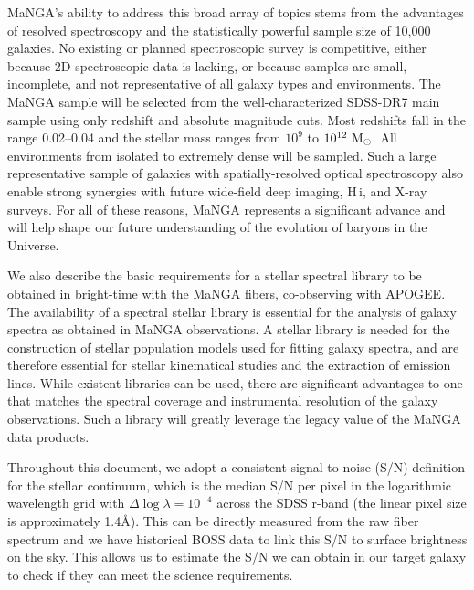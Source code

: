 \documentclass[preprint,11pt]{aastex}
\newcommand{\Msun}{{\rm M}_{\odot}}
\newcommand{\HI}{{\sc H\,i}}
\begin{document}
MaNGA's ability to address this broad array of topics stems from the
advantages of resolved spectroscopy and the statistically powerful
sample size of 10,000 galaxies.  No existing or planned spectroscopic
survey is competitive, either because 2D spectroscopic data is
lacking, or because samples are small, incomplete, and not
representative of all galaxy types and environments.  The MaNGA sample
will be selected from the well-characterized SDSS-DR7 main sample
using only redshift and absolute magnitude cuts. Most redshifts fall
in the range 0.02--0.04 and the stellar mass ranges from $10^9$ to
$10^{12}~\Msun$.  All environments from isolated to extremely dense
will be sampled. Such a large representative sample of galaxies with
spatially-resolved optical spectroscopy also enable strong synergies
with future wide-field deep imaging, \HI, and X-ray surveys.  For all
of these reasons, MaNGA represents a significant advance and will help
shape our future understanding of the evolution of baryons in the
Universe.

We also describe the basic requirements for a stellar spectral library to be
obtained in bright-time with the MaNGA fibers, co-observing with
APOGEE. The availability of a spectral stellar library is essential
for the analysis of galaxy spectra as obtained in MaNGA
observations. A stellar library is needed for the construction of
stellar population models used for fitting galaxy spectra, and are
therefore essential for stellar kinematical studies and the extraction
of emission lines. While existent libraries can be used, there are
significant advantages to one that matches the spectral coverage and
instrumental resolution of the galaxy observations. Such a library
will greatly leverage the legacy value of the MaNGA data products. %

Throughout this document, we adopt a consistent signal-to-noise (S/N)
definition for the stellar continuum, which is the median S/N per
pixel in the logarithmic wavelength grid with $\Delta \log \lambda =
10^{-4}$ across the SDSS r-band (the linear pixel size is
approximately 1.4\AA). This can be directly measured from the raw
fiber spectrum and we have historical BOSS data to link this S/N to
surface brightness on the sky. This allows us to estimate the S/N we
can obtain in our target galaxy to check if they can meet the science
requirements.
\end{document}
